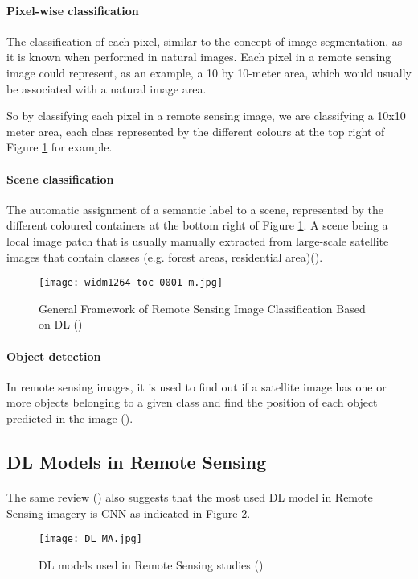 \paragraph{Pixel-wise classification} The classification of each pixel, similar to the concept of image segmentation, as it is known when performed in natural images. Each pixel in a remote sensing image could represent, as an example, a 10 by 10-meter area, which would usually be associated with a natural image area. 

So by classifying each pixel in a remote sensing image, we are classifying a 10x10 meter area, each class represented by the different colours at the top right of Figure \ref{fig_img_class_frame} for example. 

\paragraph{Scene classification} The automatic assignment of a semantic label to a scene, represented by the different coloured containers at the bottom right of Figure \ref{fig_img_class_frame}. A scene being a local image patch that is usually manually extracted from large-scale satellite images that contain classes (e.g. forest areas, residential area)(\cite{https://doi.org/10.1002/widm.1264}).

    \begin{figure}[hbt!]
        \centering
        \texttt{[image: widm1264-toc-0001-m.jpg]}
        \caption{General Framework of Remote Sensing Image Classification Based on \gls{DL} (\cite{https://doi.org/10.1002/widm.1264})}
        \label{fig_img_class_frame}
    \end{figure}


\paragraph{Object detection} In remote sensing images, it is used to find out if a satellite image has one or more objects belonging to a given class and find the position of each object predicted in the image (\cite{CHENG201611}).

\subsection{\gls{DL} Models in Remote Sensing} \label{dl_models_rs}
\paragraph{}
The same review (\cite{MA2019166}) also suggests that the most used \gls{DL} model in Remote Sensing imagery is \gls{CNN} as indicated in Figure \ref{fig_dl_rs}.
    \begin{figure}[hbt!]
        \centering
        \texttt{[image: DL\_MA.jpg]}
        \caption{\gls{DL} models used in Remote Sensing studies (\cite{MA2019166})}
        \label{fig_dl_rs}
    \end{figure}
    

